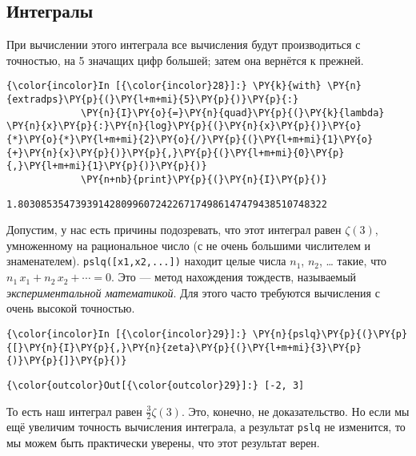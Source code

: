 \subsection{Интегралы}
\label{mpmath5}

При вычислении этого интеграла все вычисления будут производиться с
точностью, на 5 значащих цифр большей; затем она вернётся к прежней.

    \begin{Verbatim}[commandchars=\\\{\}]
{\color{incolor}In [{\color{incolor}28}]:} \PY{k}{with} \PY{n}{extradps}\PY{p}{(}\PY{l+m+mi}{5}\PY{p}{)}\PY{p}{:}
             \PY{n}{I}\PY{o}{=}\PY{n}{quad}\PY{p}{(}\PY{k}{lambda} \PY{n}{x}\PY{p}{:}\PY{n}{log}\PY{p}{(}\PY{n}{x}\PY{p}{)}\PY{o}{*}\PY{o}{*}\PY{l+m+mi}{2}\PY{o}{/}\PY{p}{(}\PY{l+m+mi}{1}\PY{o}{+}\PY{n}{x}\PY{p}{)}\PY{p}{,}\PY{p}{(}\PY{l+m+mi}{0}\PY{p}{,}\PY{l+m+mi}{1}\PY{p}{)}\PY{p}{)}
             \PY{n+nb}{print}\PY{p}{(}\PY{n}{I}\PY{p}{)}
\end{Verbatim}

    \begin{Verbatim}[commandchars=\\\{\}]
1.803085354739391428099607242267174986147479438510748322

    \end{Verbatim}

    Допустим, у нас есть причины подозревать, что этот интеграл равен
\(\zeta(3)\), умноженному на рациональное число (с не очень большими
числителем и знаменателем). \texttt{pslq({[}x1,x2,...{]})} находит целые
числа \(n_1\), \(n_2\), \ldots{} такие, что
\(n_1\,x_1 + n_2\,x_2 + \cdots = 0\). Это --- метод нахождения тождеств,
называемый \emph{экспериментальной математикой}. Для этого часто
требуются вычисления с очень высокой точностью.

    \begin{Verbatim}[commandchars=\\\{\}]
{\color{incolor}In [{\color{incolor}29}]:} \PY{n}{pslq}\PY{p}{(}\PY{p}{[}\PY{n}{I}\PY{p}{,}\PY{n}{zeta}\PY{p}{(}\PY{l+m+mi}{3}\PY{p}{)}\PY{p}{]}\PY{p}{)}
\end{Verbatim}

            \begin{Verbatim}[commandchars=\\\{\}]
{\color{outcolor}Out[{\color{outcolor}29}]:} [-2, 3]
\end{Verbatim}
        
    То есть наш интеграл равен \(\frac{3}{2} \zeta(3)\). Это, конечно, не
доказательство. Но если мы ещё увеличим точность вычисления интеграла, а
результат \texttt{pslq} не изменится, то мы можем быть практически
уверены, что этот результат верен.

